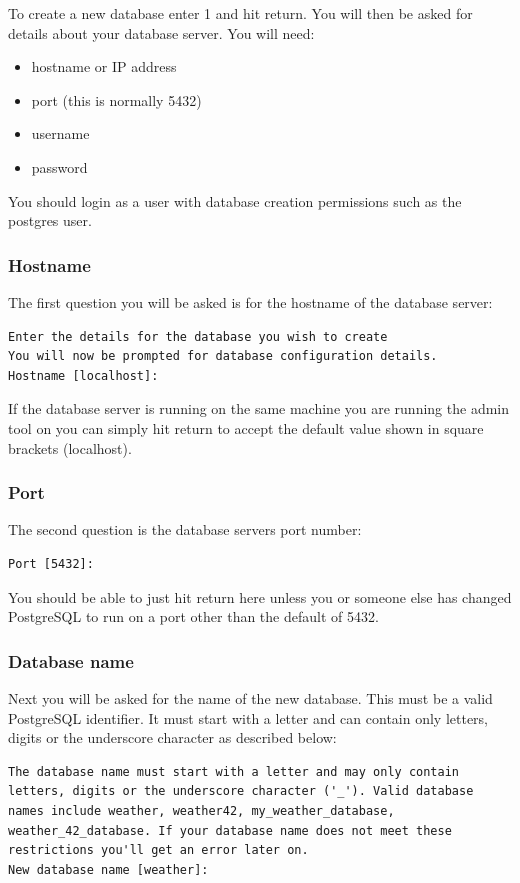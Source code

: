 \documentclass[a4paper,10pt,draft]{book}
\begin{document}
To create a new database enter 1 and hit return. You will then be asked for details about your database server. You will need:
\begin{itemize}
\item hostname or IP address
\item port (this is normally 5432)
\item username
\item password
\end{itemize}
You should login as a user with database creation permissions such as the postgres user.

\subsubsection{Hostname}
The first question you will be asked is for the hostname of the database server:
\begin{verbatim}
Enter the details for the database you wish to create
You will now be prompted for database configuration details.
Hostname [localhost]:
\end{verbatim}

If the database server is running on the same machine you are running the admin tool on you can simply hit return to accept the default value shown in square brackets (localhost).

\subsubsection{Port}
The second question is the database servers port number:
\begin{verbatim}
Port [5432]:
\end{verbatim}
You should be able to just hit return here unless you or someone else has changed PostgreSQL to run on a port other than the default of 5432.

\subsubsection{Database name}
Next you will be asked for the name of the new database. This must be a valid PostgreSQL identifier. It must start with a letter and can contain only letters, digits or the underscore character as described below:

\begin{verbatim}
The database name must start with a letter and may only contain 
letters, digits or the underscore character ('_'). Valid database
names include weather, weather42, my_weather_database, 
weather_42_database. If your database name does not meet these 
restrictions you'll get an error later on.
New database name [weather]:
\end{verbatim}
\end{document}
